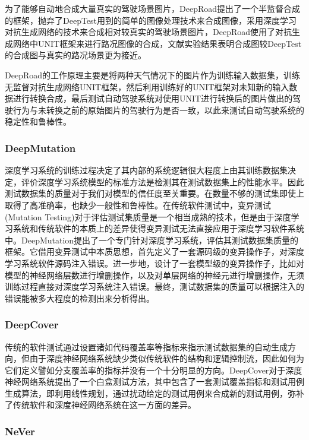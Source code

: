 为了能够自动地合成大量真实的驾驶场景图片，DeepRoad提出了一个半监督合成的框架，抛弃了DeepTest用到的简单的图像处理技术来合成图像，采用深度学习对抗生成网络的技术来合成相对较真实的驾驶场景图片，DeepRoad使用了对抗生成网络中UNIT\cite{UNIT}框架来进行路况图像的合成，文献\cite{DeepRoad}实验结果表明合成图较DeepTest的合成图与真实的路况场景更为接近。

DeepRoad的工作原理主要是将两种天气情况下的图片作为训练输入数据集，训练无监督对抗生成网络UNIT\cite{UNIT}框架，然后利用训练好的UNIT框架对未知新的输入数据进行转换合成，最后测试自动驾驶系统对使用UNIT进行转换后的图片做出的驾驶行为与未转换之前的原始图片的驾驶行为是否一致，以此来测试自动驾驶系统的稳定性和鲁棒性。

\subsubsection{DeepMutation}

深度学习系统的训练过程决定了其内部的系统逻辑很大程度上由其训练数据集决定，评价深度学习系统模型的标准方法是检测其在测试数据集上的性能水平。因此测试数据集的质量对于我们对模型的信任度至关重要。在数量不够的测试集即使上取得了高准确率，也缺少一般性和鲁棒性。在传统软件测试中，变异测试(Mutation Testing)对于评估测试集质量是一个相当成熟的技术，但是由于深度学习系统和传统软件的本质上的差异使得变异测试无法直接应用于深度学习软件系统中。DeepMutation提出了一个专门针对深度学习系统，评估其测试数据集质量的框架。它借用变异测试中本质思想，首先定义了一套源码级的变异操作子，对深度学习系统软件源码注入错误。进一步地，设计了一套模型级的变异操作子，比如对模型的神经网络层数进行增删操作，以及对单层网络的神经元进行增删操作，无须训练过程直接对深度学习系统注入错误。最终，测试数据集的质量可以根据注入的错误能被多大程度的检测出来分析得出。

\subsubsection{DeepCover}

传统的软件测试通过设置诸如代码覆盖率等指标来指示测试数据集的自动生成方向，但由于深度神经网络系统缺少类似传统软件的结构和逻辑控制流，因此如何为它们定义譬如分支覆盖率的指标并没有一个十分明显的方向。DeepCover\cite{DeepCover}对于深度神经网络系统提出了一个白盒测试方法，其中包含了一套测试覆盖指标和测试用例生成算法，即利用线性规划，通过扰动给定的测试用例来合成新的测试用例，弥补了传统软件和深度神经网络系统在这一方面的差异。

\subsubsection{NeVer}

